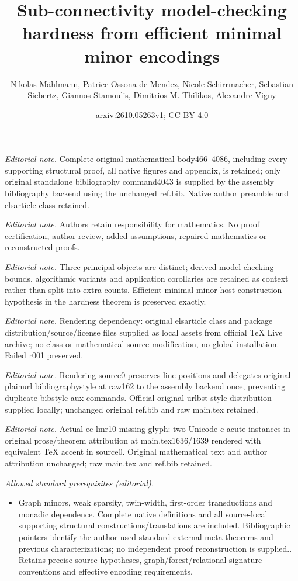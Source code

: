 \documentclass[1p,number,11pt]{elsarticle}
\title{Sub-connectivity model-checking hardness from efficient minimal minor encodings}
\author{Nikolas Mählmann, Patrice Ossona de Mendez, Nicole Schirrmacher, Sebastian Siebertz, Giannos Stamoulis, Dimitrios M. Thilikos, Alexandre Vigny}
\date{arxiv:2610.05263v1; CC BY 4.0}
\theoremstyle{plain}
\begin{document}
\maketitle
\noindent\textit{Editorial note.} Complete original mathematical body466--4086, including every supporting structural proof, all native figures and appendix, is retained; only original standalone bibliography command4043 is supplied by the assembly bibliography backend using the unchanged ref.bib. Native author preamble and elsarticle class retained.\par\medskip
\noindent\textit{Editorial note.} Authors retain responsibility for mathematics. No proof certification, author review, added assumptions, repaired mathematics or reconstructed proofs.\par\medskip
\noindent\textit{Editorial note.} Three principal objects are distinct; derived model-checking bounds, algorithmic variants and application corollaries are retained as context rather than split into extra counts. Efficient minimal-minor-host construction hypothesis in the hardness theorem is preserved exactly.\par\medskip
\noindent\textit{Editorial note.} Rendering dependency: original elsarticle class and package distribution/source/license files supplied as local assets from official TeX Live archive; no class or mathematical source modification, no global installation. Failed r001 preserved.\par\medskip
\noindent\textit{Editorial note.} Rendering source0 preserves line positions and delegates original plainurl bibliographystyle at raw162 to the assembly backend once, preventing duplicate bibstyle aux commands. Official original urlbst style distribution supplied locally; unchanged original ref.bib and raw main.tex retained.\par\medskip
\noindent\textit{Editorial note.} Actual ec-lmr10 missing glyph: two Unicode c-acute instances in original prose/theorem attribution at main.tex1636/1639 rendered with equivalent TeX accent in source0. Original mathematical text and author attribution unchanged; raw main.tex and ref.bib retained.\par\medskip
\noindent\textit{Allowed standard prerequisites (editorial).}\begin{itemize}
\item Graph minors, weak sparsity, twin-width, first-order transductions and monadic dependence. Complete native definitions and all source-local supporting structural constructions/translations are included. Bibliographic pointers identify the author-used standard external meta-theorems and previous characterizations; no independent proof reconstruction is supplied.. Retains precise source hypotheses, graph/forest/relational-signature conventions and effective encoding requirements.
\end{itemize}\medskip
\end{document}
